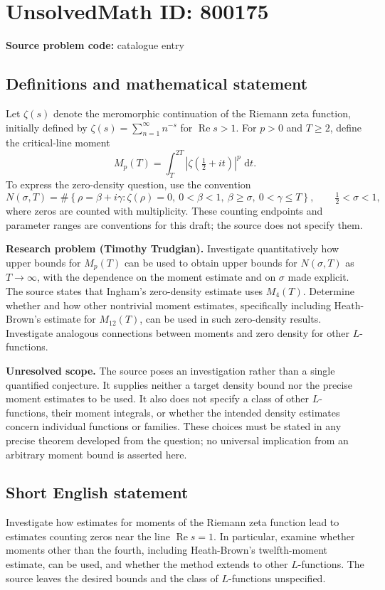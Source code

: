 \documentclass[11pt]{article}
\newcommand{\dd}{\,\mathrm{d}}
\begin{document}
\section*{UnsolvedMath ID: 800175}
\textbf{Source problem code:} catalogue entry
\subsection{Definitions and mathematical statement}
Let \(\zeta(s)\) denote the meromorphic continuation of the Riemann zeta function, initially defined by \(\zeta(s)=\sum_{n=1}^{\infty}n^{-s}\) for \(\operatorname{Re}s>1\). For \(p>0\) and \(T\geq 2\), define the critical-line moment
\[
M_p(T)=\int_T^{2T}\left|\zeta\!\left(\tfrac12+it\right)\right|^p\,\dd t.
\]
To express the zero-density question, use the convention
\[
N(\sigma,T)=\#\left\{\rho=\beta+i\gamma:\zeta(\rho)=0,\ 0<\beta<1,\ \beta\geq\sigma,\ 0<\gamma\leq T\right\},
\qquad \tfrac12<\sigma<1,
\]
where zeros are counted with multiplicity. These counting endpoints and parameter ranges are conventions for this draft; the source does not specify them.

\textbf{Research problem (Timothy Trudgian).} Investigate quantitatively how upper bounds for \(M_p(T)\) can be used to obtain upper bounds for \(N(\sigma,T)\) as \(T\to\infty\), with the dependence on the moment estimate and on \(\sigma\) made explicit. The source states that Ingham's zero-density estimate uses \(M_4(T)\). Determine whether and how other nontrivial moment estimates, specifically including Heath-Brown's estimate for \(M_{12}(T)\), can be used in such zero-density results. Investigate analogous connections between moments and zero density for other \(L\)-functions.

\textbf{Unresolved scope.} The source poses an investigation rather than a single quantified conjecture. It supplies neither a target density bound nor the precise moment estimates to be used. It also does not specify a class of other \(L\)-functions, their moment integrals, or whether the intended density estimates concern individual functions or families. These choices must be stated in any precise theorem developed from the question; no universal implication from an arbitrary moment bound is asserted here.
\subsection{Short English statement}
Investigate how estimates for moments of the Riemann zeta function lead to estimates counting zeros near the line \(\operatorname{Re}s=1\). In particular, examine whether moments other than the fourth, including Heath-Brown's twelfth-moment estimate, can be used, and whether the method extends to other \(L\)-functions. The source leaves the desired bounds and the class of \(L\)-functions unspecified.
\end{document}
